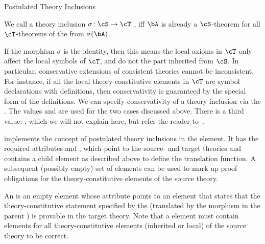 \begin{omgroup}[id=complex-theories,short=Complex Theories,
                            creators=miko,contributors=frabe]
\begin{omgroup}[id=theory-inclusions]{Postulated Theory Inclusions}
\begin{module}[id=theory-morphisms]
\begin{definition}[display=flow,id=conservative.def]
  We call a theory inclusion $\sigma\colon\cS\to\cT$ {}, iff $\bA$ is
  already a $\cS$-theorem for all $\cT$-theorems of the from $\sigma(\bA)$.
\end{definition}
If the morphism $\sigma$ is the identity, then this means the local axioms in $\cT$ only
affect the local symbols of $\cT$, and do not the part inherited from $\cS$. In
particular, conservative extensions of consistent theories cannot be inconsistent. For
instance, if all the local theory-constitutive elements in $\cT$ are symbol declarations
with definitions, then conservativity is guaranteed by the special form of the
definitions. We can specify conservativity of a theory inclusion via the
{}. The values {}
and {} are used for the two cases discussed
above. There is a third value: {}, which we will
not explain here, but refer the reader to~\cite{MAH-06-a}.

\begin{definition}[id=theory-inclusion.def]
  {\omdoc} implements the concept of postulated theory inclusions in the
  {} {} element. It has the required
  attributes {} and {},
  which point to the source- and target theories and contains a {} child
  element as described above to define the translation function. A subsequent (possibly
  empty) set of {} elements can be used to mark up proof obligations
  for the theory-constitutive elements of the source theory.
\end{definition}

\begin{definition}[id=obligation.def]
  An {} is an empty element whose {}
  attribute points to an {} element that states that the
  theory-constitutive statement specified by the {}
  (translated by the morphism in the parent {}) is provable in
  the target theory.  Note that a {} element must contain
  {} elements for all theory-constitutive elements (inherited or
  local) of the source theory to be correct.
\end{definition}


\end{module}
\end{omgroup}
\end{omgroup}
